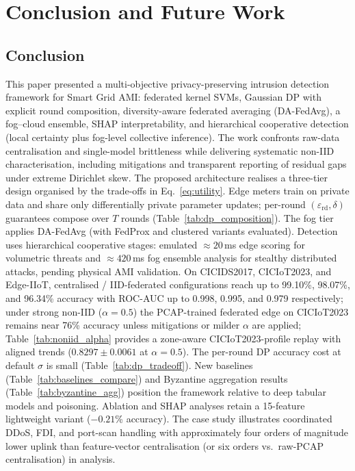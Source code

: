 \documentclass[sensors,article,submit,pdftex,moreauthors]{Definitions/mdpi}
\begin{document}
\section{Conclusion and Future Work}\label{r10}

\subsection{Conclusion}

This paper presented a multi-objective privacy-preserving intrusion detection framework for Smart Grid AMI: federated kernel SVMs, Gaussian DP with explicit round composition, diversity-aware federated averaging (DA-FedAvg), a fog--cloud ensemble, SHAP interpretability, and hierarchical cooperative detection (local certainty plus fog-level collective inference). The work confronts raw-data centralisation and single-model brittleness while delivering systematic non-IID characterisation, including mitigations and transparent reporting of residual gaps under extreme Dirichlet skew. The proposed architecture realises a three-tier design organised by the trade-offs in Eq.~\eqref{eq:utility}. Edge meters train on private data and share only differentially private parameter updates; per-round $(\varepsilon_{\mathrm{rd}},\delta)$ guarantees compose over $T$ rounds (Table~\ref{tab:dp_composition}). The fog tier applies DA-FedAvg (with FedProx and clustered variants evaluated). Detection uses hierarchical cooperative stages: emulated ${\approx}20$\,ms edge scoring for volumetric threats and ${\approx}420$\,ms fog ensemble analysis for stealthy distributed attacks, pending physical AMI validation. On CICIDS2017, CICIoT2023, and Edge-IIoT, centralised / IID-federated configurations reach up to 99.10\%, 98.07\%, and 96.34\% accuracy with ROC-AUC up to 0.998, 0.995, and 0.979 respectively; under strong non-IID ($\alpha{=}0.5$) the PCAP-trained federated edge on CICIoT2023 remains near 76\% accuracy unless mitigations or milder $\alpha$ are applied; Table~\ref{tab:noniid_alpha} provides a zone-aware CICIoT2023-profile replay with aligned trends ($0.8297{\pm}0.0061$ at $\alpha{=}0.5$). The per-round DP accuracy cost at default $\sigma$ is small (Table~\ref{tab:dp_tradeoff}). New baselines (Table~\ref{tab:baselines_compare}) and Byzantine aggregation results (Table~\ref{tab:byzantine_agg}) position the framework relative to deep tabular models and poisoning. Ablation and SHAP analyses retain a 15-feature lightweight variant (${-}0.21$\% accuracy). The case study illustrates coordinated DDoS, FDI, and port-scan handling with approximately four orders of magnitude lower uplink than feature-vector centralisation (or six orders vs.\ raw-PCAP centralisation) in analysis.
\end{document}
